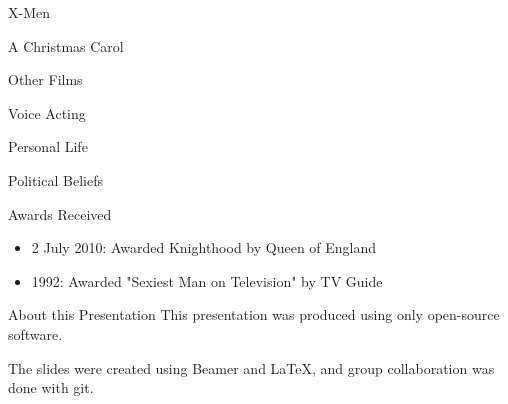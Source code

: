 \documentclass[xcolor=dvipsnames]{beamer}
\begin{document}
\begin{frame}{X-Men}

\end{frame}

\begin{frame}{A Christmas Carol}

\end{frame}

\begin{frame}{Other Films}

\end{frame}

\begin{frame}{Voice Acting}

\end{frame}

\begin{frame}{Personal Life}

\end{frame}

\begin{frame}{Political Beliefs}

\end{frame}

\begin{frame}{Awards Received}
  \begin{itemize}
    \item 2 July 2010: Awarded Knighthood by Queen of England
    \item 1992: Awarded "Sexiest Man on Television" by TV Guide
  \end{itemize}
  \end{frame}
\begin{frame}{About this Presentation}
  This presentation was produced using only open-source software.

  The slides were created using Beamer and LaTeX, and group collaboration was done
  with git.
\end{frame}
\end{document}
